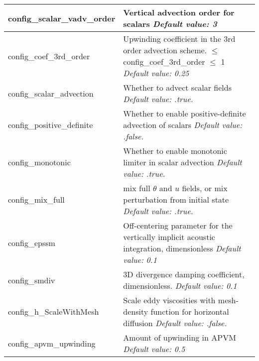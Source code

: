 {\begin{longtable}{|p{1.75in} |p{4.5in}|}
   config\_scalar\_vadv\_order & Vertical advection order for scalars \newline 
   {\em Default value: 3} \\ \hline

   config\_coef\_3rd\_order & Upwinding coefficient in the 3rd order advection scheme. \hfill\break 0 $\le$ config\_coef\_3rd\_order $\le$ 1 \newline 
   {\em Default value: 0.25} \\ \hline
   
   config\_scalar\_advection & Whether to advect scalar fields \newline 
   {\em Default value: .true.} \\ \hline   

   config\_positive\_definite & Whether to enable positive-definite advection of scalars \newline 
   {\em Default value: .false.} \\ \hline

   config\_monotonic & Whether to enable monotonic limiter in scalar advection \newline 
   {\em Default value: .true.} \\ \hline

   config\_mix\_full & mix full $\theta$ and $u$ fields, or mix perturbation from initial state \newline 
   {\em Default value: .true.} \\ \hline   
      
   config\_epssm & Off-centering parameter for the vertically implicit acoustic \hfill \break integration, dimensionless \newline 
   {\em Default value: 0.1} \\ \hline

   config\_smdiv & 3D divergence damping coefficient, dimensionless. \newline 
   {\em Default value: 0.1} \\ \hline

   config\_h\_ScaleWithMesh & Scale eddy viscosities with mesh-density function for horizontal diffusion \newline 
   {\em Default value: .false.} \\ \hline
   
   config\_apvm\_upwinding & Amount of upwinding in APVM \newline 
   {\em Default value: 0.5} \\ \hline   

\end{longtable}
}

